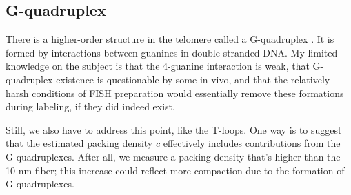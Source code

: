 \documentclass[11pt]{article}
\begin{document}
\subsection{G-quadruplex}
\label{sec-5-3}
There is a higher-order structure in the telomere called a
G-quadruplex \cite{ray-pnas-2014}. It is formed by interactions
between guanines in double stranded DNA. My limited knowledge on the
subject is that the 4-guanine interaction is weak, that G-quadruplex
existence is questionable by some in vivo, and that the relatively
harsh conditions of FISH preparation would essentially remove these
formations during labeling, if they did indeed exist.

Still, we also have to address this point, like the T-loops. One way
is to suggest that the estimated packing density $c$ effectively
includes contributions from the G-quadruplexes. After all, we measure
a packing density that's higher than the 10 nm fiber; this increase
could reflect more compaction due to the formation of G-quadruplexes.


\printbibliography
\end{document}

